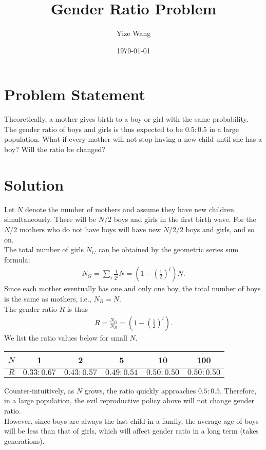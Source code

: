 \documentclass[12pt]{article}
\title{Gender Ratio Problem}
\author{Yize Wang}
\date{\today}
\begin{document}
\maketitle
\pagebreak

\section{Problem Statement}
Theoretically, a mother gives birth to a boy or girl with the same probability. The gender ratio of boys and girls is thus expected to be $0.5:0.5$ in a large population. What if every mother will not stop having a new child until she has a boy? Will the ratio be changed?

\section{Solution}
Let $N$ denote the number of mothers and assume they have new children simultaneously. There will be $N/2$ boys and girls in the first birth wave. For the $N/2$ mothers who do not have boys will have new $N/2/2$ boys and girls, and so on. \\
The total number of girls $N_G$ can be obtained by the geometric series sum formula:
\begin{align*}
	N_G = \sum_{i}\frac{1}{2^i}N = \left( 1-\left( \frac{1}{2} \right)^i \right) N.
\end{align*}
Since each mother eventually has one and only one boy, the total number of boys is the same as mothers, i.e., $N_B = N$.\\
The gender ratio $R$ is thus
\begin{align*}
	R =\frac{ N_G}{N_B} = \left( 1-\left( \frac{1}{2} \right)^i \right).
\end{align*}
We list the ratio values below for small $N$.
\begin{center}
	\begin{tabular}{|c| c c c c c|}
		\hline
		$N$ & 1           & 2           & 5           & 10          & 100         \\
		\hline
		$R$ & $0.33:0.67$ & $0.43:0.57$ & $0.49:0.51$ & $0.50:0.50$ & $0.50:0.50$ \\
		\hline
	\end{tabular}
\end{center}
Counter-intuitively, as $N$ grows, the ratio quickly approaches $0.5:0.5$. Therefore, in a large population, the evil reproductive policy above will not change gender ratio. \\
However, since boys are always the last child in a family, the average age of boys will be less than that of girls, which will affect gender ratio in a long term (takes generations).
\end{document}
